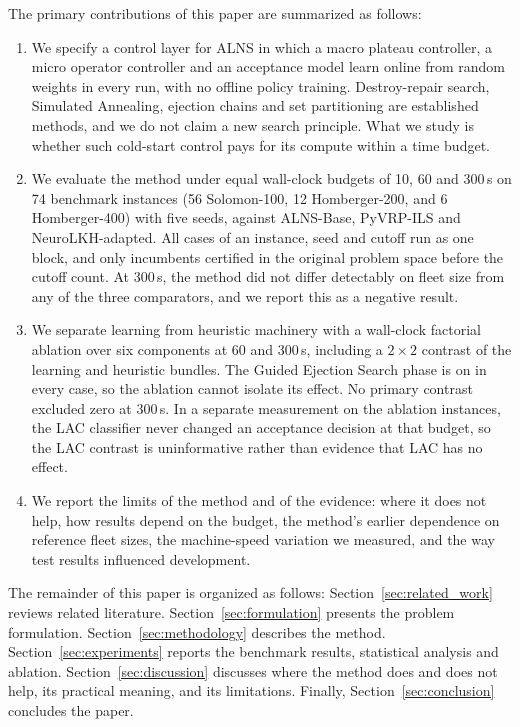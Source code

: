 \documentclass{ieeeaccess}
\begin{document}
The primary contributions of this paper are summarized as follows:
\begin{enumerate}\setlength{\itemsep}{0pt}\setlength{\parskip}{0pt}
    \item We specify a control layer for ALNS in which a macro plateau controller, a micro operator controller and an acceptance model learn online from random weights in every run, with no offline policy training. Destroy-repair search, Simulated Annealing, ejection chains and set partitioning are established methods, and we do not claim a new search principle. What we study is whether such cold-start control pays for its compute within a time budget.
    \item We evaluate the method under equal wall-clock budgets of 10, 60 and 300\,s on 74 benchmark instances (56 Solomon-100, 12 Homberger-200, and 6 Homberger-400) with five seeds, against ALNS-Base, PyVRP-ILS and NeuroLKH-adapted. All cases of an instance, seed and cutoff run as one block, and only incumbents certified in the original problem space before the cutoff count. At 300\,s, the method did not differ detectably on fleet size from any of the three comparators, and we report this as a negative result.
    \item We separate learning from heuristic machinery with a wall-clock factorial ablation over six components at 60 and 300\,s, including a $2\times2$ contrast of the learning and heuristic bundles. The Guided Ejection Search phase is on in every case, so the ablation cannot isolate its effect. No primary contrast excluded zero at 300\,s. In a separate measurement on the ablation instances, the LAC classifier never changed an acceptance decision at that budget, so the LAC contrast is uninformative rather than evidence that LAC has no effect.
    \item We report the limits of the method and of the evidence: where it does not help, how results depend on the budget, the method's earlier dependence on reference fleet sizes, the machine-speed variation we measured, and the way test results influenced development.
\end{enumerate}

The remainder of this paper is organized as follows: Section~\ref{sec:related_work} reviews related literature. Section~\ref{sec:formulation} presents the problem formulation. Section~\ref{sec:methodology} describes the method. Section~\ref{sec:experiments} reports the benchmark results, statistical analysis and ablation. Section~\ref{sec:discussion} discusses where the method does and does not help, its practical meaning, and its limitations. Finally, Section~\ref{sec:conclusion} concludes the paper.
\end{document}
